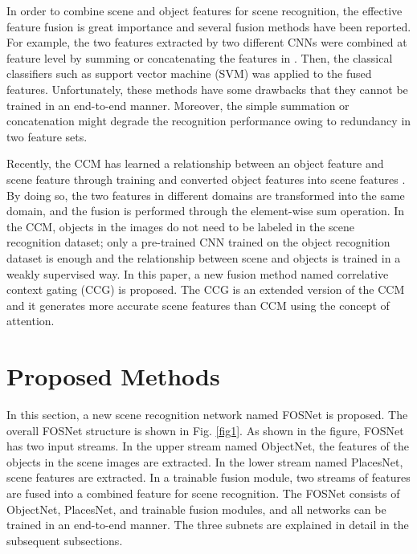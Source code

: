 \documentclass[journal,comsoc]{IEEEtran}
\begin{document}
In order to combine scene and object features for scene recognition, the effective feature fusion is great importance and several fusion methods have been reported. For example, the two features extracted by two different CNNs were combined at feature level by summing or concatenating the features in \cite{b3,b4,b5,b6,b7,b8,b9,b12,b13,b14,b15,b16,b17}. Then, the classical classifiers such as support vector machine (SVM) \cite{b49} was applied to the fused features. Unfortunately, these methods have some drawbacks that they cannot be trained in an end-to-end manner. Moreover, the simple summation or concatenation might degrade the recognition performance owing to redundancy in two feature sets.

Recently, the CCM has learned a relationship between an object feature and scene feature through training and converted object features into scene features \cite{b21}. By doing so, the two features in different domains are transformed into the same domain, and the fusion is performed through the element-wise sum operation. In the CCM, objects in the images do not need to be labeled in the scene recognition dataset; only a pre-trained CNN trained on the object recognition dataset is enough and the relationship between scene and objects is trained in a weakly supervised way. In this paper, a new fusion method named correlative context gating (CCG) is proposed. The CCG is an extended version of the CCM and it generates more accurate scene features than CCM using the concept of attention.





\section{Proposed Methods}
\label{s3}

In this section, a new scene recognition network named FOSNet is proposed. The overall FOSNet structure is shown in Fig. \ref{fig1}. As shown in the figure, FOSNet has two input streams. In the upper stream named ObjectNet, the features of the objects in the scene images are extracted. In the lower stream named PlacesNet, scene features are extracted. In a trainable fusion module, two streams of features are fused into a combined feature for scene recognition. The FOSNet consists of ObjectNet, PlacesNet, and trainable fusion modules, and all networks can be trained in an end-to-end manner. The three subnets are explained in detail in the subsequent subsections.
\end{document}
